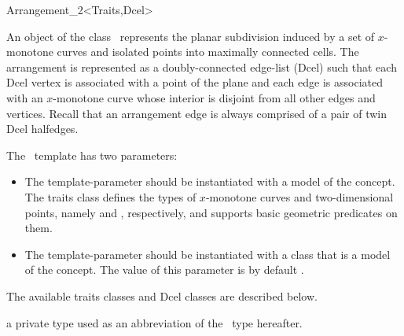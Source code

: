
\ccRefPageBegin

\begin{ccRefClass}{Arrangement_2<Traits,Dcel>}
\label{arr_ref:arr}

\ccDefinition

An object  of the class \ccClassTemplateName\ represents the
planar subdivision induced by a set of $x$-monotone curves and isolated
points into maximally connected cells. The arrangement is represented as
a doubly-connected edge-list ({\sc Dcel}) such that each {\sc Dcel} vertex
is associated with a point of the plane and each edge is
associated with an $x$-monotone curve whose interior is disjoint from all
other edges and vertices. Recall that an arrangement
edge is always comprised of a pair of twin {\sc Dcel} halfedges.

The \ccClassTemplateName\ template has two parameters:
\begin{itemize}
\item The  template-parameter should be instantiated with
a model of the  concept. The traits
class defines the types of $x$-monotone curves and two-dimensional
points, namely  and ,
respectively, and supports basic geometric predicates on them.
\item The  template-parameter should be instantiated with
a class that is a model of the  concept. The
value of this parameter is by default
.
\end{itemize}
The available traits classes and {\sc Dcel} classes are described below. 


\ccTypes

\ccThreeToTwo
{}
  {a private type used as an abbreviation of the \ccRefName\ type hereafter.}
  
\ccGlue
{}


\end{ccRefClass}
